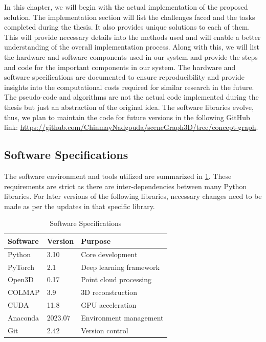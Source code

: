 In this chapter, we will begin with the actual implementation of the proposed solution. The implementation section will list the challenges faced and
the tasks completed during the thesis. It also provides unique solutions to each of them. This will provide necessary details into the methods used and will
enable a better understanding of the overall implementation process. Along with this, we will list the hardware and software components 
used in our system and provide the steps and code for the important components in our system. 
The hardware and software specifications are documented to ensure reproducibility and provide
insights into the computational costs required for similar research in the future. The pseudo-code and algorithms are not the actual code implemented
during the thesis but just an abstraction of the original idea. The software libraries evolve, thus, we plan to maintain the code for
future versions in the following GitHub link: \url{https://github.com/ChinmayNadgouda/sceneGraph3D/tree/concept-graph}.

\subsection{Software Specifications}
The software environment and tools utilized are summarized in \ref{tab:software_specs}. These requirements are strict as there are inter-dependencies
between many Python libraries. For later versions of the following libraries, necessary changes need to be made as per the updates in that specific library.

\begin{table}[ht]
    \centering
    \caption{Software Specifications}
    \label{tab:software_specs}
    \begin{tabular}{lll}
        \toprule
        \textbf{Software}      & \textbf{Version}   & \textbf{Purpose}                     \\
        \midrule
        Python                & 3.10               & Core development                      \\
        PyTorch               & 2.1                & Deep learning framework               \\
        Open3D                & 0.17               & Point cloud processing                \\
        COLMAP                & 3.9                & 3D reconstruction                     \\
        CUDA                  & 11.8               & GPU acceleration                      \\
        Anaconda              & 2023.07            & Environment management                \\
        Git                   & 2.42               & Version control                       \\
        \bottomrule
    \end{tabular}
\end{table}
